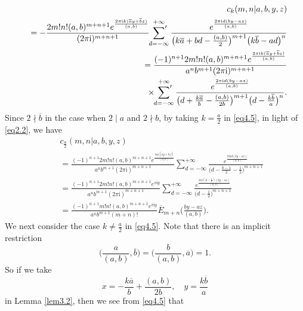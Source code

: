 \documentclass[reqno]{amsart}
\numberwithin{equation}{section}
\begin{document}
\begin{eqnarray}\label{eq4.5}
&&c_{k}(m,n|a,b,y,z)\nonumber\\
&&=-\frac{2m!n!(a,b)^{m+n+1}e^{\frac{2\pi\mathrm{i}k(\overline{a}y+\overline{b}z)}{(a,b)}}}{(2\pi \mathrm{i})^{m+n+1}}\sideset{}{'}\sum_{d=-\infty}^{+\infty}
\frac{e^{\frac{2\pi\mathrm{i}d(by-az)}{(a,b)}}}{\bigl(k\overline{a}+bd-\frac{(a,b)}{2}\bigl)^{m+1}
\bigl(k\overline{b}-ad\bigl)^{n}}\nonumber\\
&&=\frac{(-1)^{n+1}2m!n!(a,b)^{m+n+1}e^{\frac{2\pi\mathrm{i}k(\overline{a}y+\overline{b}z)}{(a,b)}}}{a^{n}b^{m+1}(2\pi \mathrm{i})^{m+n+1}}\nonumber\\
&&\qquad\times\sideset{}{'}\sum_{d=-\infty}^{+\infty}
\frac{e^{\frac{2\pi\mathrm{i}d(by-az)}{(a,b)}}}{\bigl(d+\frac{k\overline{a}}{b}-\frac{(a,b)}{2b}\bigl)^{m+1}
\bigl(d-\frac{k\overline{b}}{a}\bigl)^{n}}.
\end{eqnarray}
Since $2\nmid \overline{b}$ in the case when $2\mid a$ and $2\nmid b$, by taking $k=\frac{a}{2}$ in \eqref{eq4.5}, in light of \eqref{eq2.2}, we have
\begin{eqnarray}\label{eq4.6}
&&c_{\frac{a}{2}}(m,n|a,b,y,z)\nonumber\\
&&=\frac{(-1)^{n+1}2m!n!(a,b)^{m+n+1}e^{\frac{\pi\mathrm{i}a(\overline{a}y+\overline{b}z)}{(a,b)}}}{a^{n}b^{m+1}(2\pi\mathrm{i})^{m+n+1}}\sum_{d=-\infty}^{+\infty}
\frac{e^{\frac{2\pi\mathrm{i}d(by-az)}{(a,b)}}}{\bigl(d-\frac{\overline{b}-1}{2}-\frac{1}{2}\bigl)^{m+n+1}}\nonumber\\
&&=\frac{(-1)^{n+1}2m!n!(a,b)^{m+n+1}e^{\pi\mathrm{i}y}}{a^{n}b^{m+1}(2\pi\mathrm{i})^{m+n+1}}\sum_{d=-\infty}^{+\infty}
\frac{e^{\frac{2\pi\mathrm{i}(d-\frac{1}{2})(by-az)}{(a,b)}}}{\bigl(d-\frac{1}{2}\bigl)^{m+n+1}}\nonumber\\
&&=\frac{(-1)^{n+1}m!n!(a,b)^{m+n+1}e^{\pi\mathrm{i}y}}{a^{n}b^{m+1}(m+n)!}\overline{E}_{m+n}\biggl(\frac{by-az}{(a,b)}\biggl).
\end{eqnarray}
We next consider the case $k\not=\frac{a}{2}$ in \eqref{eq4.5}. Note that there is an implicit restriction
\begin{equation*}
\biggl(\frac{a}{(a,b)},\overline{b}\biggl)=\biggl(\frac{b}{(a,b)},\overline{a}\biggl)=1.
\end{equation*}
So if we take
\begin{equation*}
x=-\frac{k\overline{a}}{b}+\frac{(a,b)}{2b}, \quad y=\frac{k\overline{b}}{a}
\end{equation*}
in Lemma \ref{lem3.2}, then we see from \eqref{eq4.5} that
\end{document}
